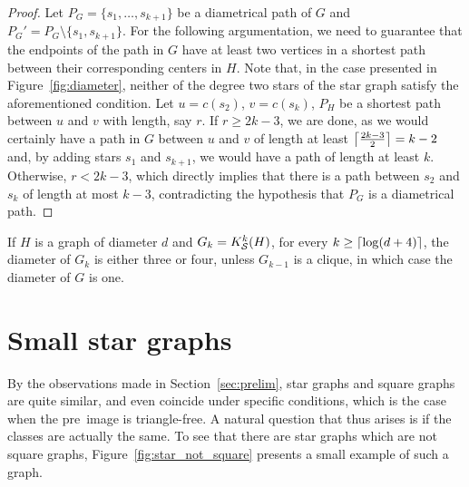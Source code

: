 \begin{proof}
    Let $P_G = \{s_1, \dots, s_{k+1}\}$ be a diametrical path of $G$ and $P_G' = P_G \setminus \{s_1, s_{k+1}\}$.
    For the following argumentation, we need to guarantee that the endpoints of the path in $G$ have at least two vertices in a shortest path between their corresponding centers in $H$.
    Note that, in the case presented in Figure~\ref{fig:diameter}, neither of the degree two stars of the star graph satisfy the aforementioned condition.
    Let $u = c(s_2)$, $v = c(s_k)$, $P_H$ be a shortest path between $u$ and $v$ with length, say $r$.
    If $r \geq 2k - 3$, we are done, as we would certainly have a path in $G$ between $u$ and $v$ of length at least $\left\lceil\frac{2k-3}{2}\right\rceil = k-2$ and, by adding stars $s_1$ and $s_{k+1}$, we would have a path of length at least $k$.
    Otherwise, $r < 2k - 3$, which directly implies that there is a path between $s_2$ and $s_k$ of length at most $k-3$, contradicting the hypothesis that $P_G$ is a diametrical path.
\end{proof}

\begin{corollary}
	If $H$ is a graph of diameter $d$ and $G_k = K_{\mathcal{S}}^k(H)$, for every $k \geq \left\lceil\log (d + 4)\right\rceil$, the diameter of $G_k$ is either three or four, unless $G_{k-1}$ is a clique, in which case the diameter of $G$ is one.
\end{corollary}

\section{Small star graphs}


By the observations made in Section~\ref{sec:prelim}, star graphs and square graphs are quite similar, and even coincide under specific conditions, which is the case when the pre~image is triangle-free.
A natural question that thus arises is if the classes are actually the same.
To see that there are star graphs which are not square graphs, Figure~\ref{fig:star_not_square} presents a small example of such a graph.

